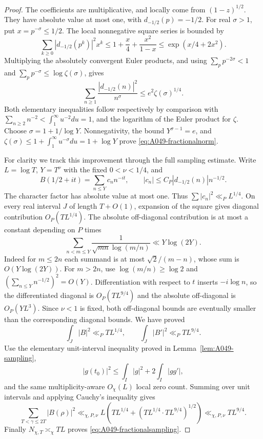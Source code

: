 \begin{proof}
The coefficients are multiplicative, and locally come from
\((1-z)^{1/2}\). They have absolute value at most one, with
\(d_{-1/2}(p)=-1/2\). For real \(\sigma>1\), put
\(x=p^{-\sigma}\le1/2\). The local nonnegative square series
is bounded by
\[
 \sum_{k\ge0}|d_{-1/2}(p^k)|^2x^k
       \le1+\frac x4+\frac{x^2}{1-x}
       \le\exp(x/4+2x^2).
\]
Multiplying the absolutely convergent Euler products, and using
\(\sum_p p^{-2\sigma}<1\) and
\(\sum_p p^{-\sigma}\le\log\zeta(\sigma)\), gives
\[
 \sum_{n\ge1}\frac{|d_{-1/2}(n)|^2}{n^\sigma}
                               \le e^2\zeta(\sigma)^{1/4}.
\]
Both elementary inequalities follow respectively by comparison
with \(\sum_{n\ge2}n^{-2}<\int_1^\infty u^{-2}du=1\),
and the logarithm of the Euler product for \(\zeta\).
Choose \(\sigma=1+1/\log Y\). Nonnegativity, the bound
\(Y^{\sigma-1}=e\), and
\(\zeta(\sigma)\le1+\int_1^\infty u^{-\sigma}du
=1+\log Y\) prove \eqref{eq:A049-fractionalnorm}.

For clarity we track this improvement through the full sampling
estimate. Write \(L=\log T\), \(Y=T^\nu\) with the fixed
\(0<\nu<1/4\), and
\[
 B(1/2+it)=\sum_{n\le Y}c_n n^{-it},\qquad
 |c_n|\le C_P|d_{-1/2}(n)|n^{-1/2}.
\]
The character factor has absolute value at most one. Thus
\(\sum|c_n|^2\ll_P L^{1/4}\).
On every real interval \(J\) of length \(T+O(1)\), expansion
of the square gives diagonal contribution
\(O_P(TL^{1/4})\). The absolute off-diagonal contribution is
at most a constant depending on \(P\) times
\[
 \sum_{n<m\le Y}\frac1{\sqrt{mn}\log(m/n)}
                                          \ll Y\log(2Y).
\]
Indeed for \(m\le2n\) each summand is at most
\(\sqrt2/(m-n)\), whose sum is \(O(Y\log(2Y))\).
For \(m>2n\), use \(\log(m/n)\ge\log2\) and
\((\sum_{n\le Y}n^{-1/2})^2=O(Y)\).
Differentiation with respect to \(t\) inserts \(-i\log n\),
so the differentiated diagonal is \(O_P(TL^{9/4})\) and
the absolute off-diagonal is \(O_P(YL^3)\).
Since \(\nu<1\) is fixed, both off-diagonal bounds are
eventually smaller than the corresponding diagonal bounds.
We have proved
\[
                 \int_J|B|^2\ll_P TL^{1/4},\qquad
                 \int_J|B'|^2\ll_P TL^{9/4}.
\]
Use the elementary unit-interval inequality proved in
Lemma~\ref{lem:A049-sampling},
\[
 |g(t_0)|^2\le\int_I|g|^2+2\int_I|gg'|,
\]
and the same multiplicity-aware \(O_\chi(L)\) local zero
count. Summing over unit intervals and applying Cauchy's
inequality gives
\[
 \sum_{T<\gamma\le2T}|B(\rho)|^2
       \ll_{\chi,P,\nu}
          L\left(TL^{1/4}+
                       (TL^{1/4}\cdot TL^{9/4})^{1/2}\right)
       \ll_{\chi,P,\nu}TL^{9/4}.
\]
Finally \(N_{\chi,T}\asymp_\chi TL\) proves
\eqref{eq:A049-fractionalsampling}.
\end{proof}

